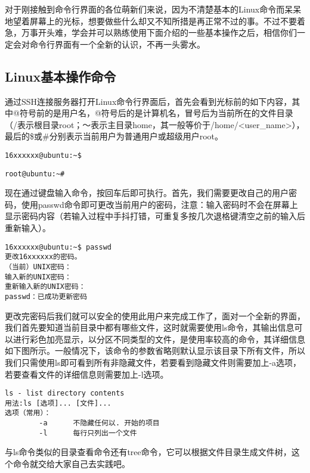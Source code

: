 对于刚接触到命令行界面的各位萌新们来说，因为不清楚基本的Linux命令而呆呆地望着屏幕上的光标，想要做些什么却又不知所措是再正常不过的事。不过不要着急，万事开头难，学会并可以熟练使用下面介绍的一些基本操作之后，相信你们一定会对命令行界面有一个全新的认识，不再一头雾水。

\subsection{Linux基本操作命令}
通过SSH连接服务器打开Linux命令行界面后，首先会看到光标前的如下内容，其中@符号前的是用户名，@符号后的是计算机名，冒号后为当前所在的文件目录（/表示根目录root；～表示主目录home，其一般等价于/home/<user\_name>），最后的\$或\#分别表示当前用户为普通用户或超级用户root。

\begin{verbatim}
16xxxxxx@ubuntu:~$
\end{verbatim}
\begin{verbatim}
root@ubuntu:~#
\end{verbatim}

现在通过键盘输入命令，按回车后即可执行。首先，我们需要更改自己的用户密码，使用passwd命令即可更改当前用户的密码，注意：输入密码时不会在屏幕上显示密码内容（若输入过程中手抖打错，可重复多按几次退格键清空之前的输入后重新输入）。

\begin{verbatim}
16xxxxxx@ubuntu:~$ passwd
更改16xxxxxx的密码。
（当前）UNIX密码：
输入新的UNIX密码：
重新输入新的UNIX密码：
passwd：已成功更新密码
\end{verbatim}

更改完密码后我们就可以安全的使用此用户来完成工作了，面对一个全新的界面，我们首先要知道当前目录中都有哪些文件，这时就需要使用ls命令，其输出信息可以进行彩色加亮显示，以分区不同类型的文件，是使用率较高的命令，其详细信息如下图所示。一般情况下，该命令的参数省略则默认显示该目录下所有文件，所以我们只需使用ls即可看到所有非隐藏文件，若要看到隐藏文件则需要加上-a选项，若要查看文件的详细信息则需要加上-l选项。

\begin{verbatim}
ls - list directory contents
用法:ls [选项]... [文件]...
选项（常用）：
		-a		不隐藏任何以. 开始的项目
		-l		每行只列出一个文件
\end{verbatim}

\begin{note}
与ls命令类似的目录查看命令还有tree命令，它可以根据文件目录生成文件树，这个命令就交给大家自己去实践吧。
\end{note}

